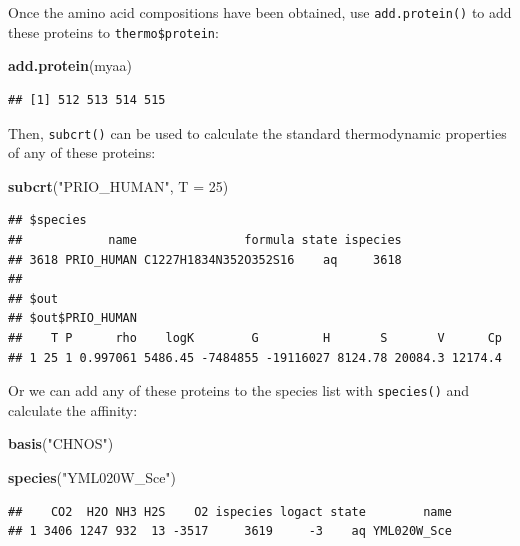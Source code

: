 \documentclass[]{tufte-handout}
\newenvironment{Shaded}{}{}
\newcommand{\KeywordTok}[1]{\textcolor[rgb]{0.00,0.44,0.13}{\textbf{#1}}}
\newcommand{\DataTypeTok}[1]{\textcolor[rgb]{0.56,0.13,0.00}{#1}}
\newcommand{\DecValTok}[1]{\textcolor[rgb]{0.25,0.63,0.44}{#1}}
\newcommand{\StringTok}[1]{\textcolor[rgb]{0.25,0.44,0.63}{#1}}
\newcommand{\NormalTok}[1]{#1}
\begin{document}
Once the amino acid compositions have been obtained, use
{\texttt{add.protein()}} to add these proteins to
\texttt{thermo\$protein}:

\begin{Shaded}
\begin{Highlighting}[]
\KeywordTok{add.protein}\NormalTok{(myaa)}
\end{Highlighting}
\end{Shaded}

\begin{verbatim}
## [1] 512 513 514 515
\end{verbatim}

Then, {\texttt{subcrt()}} can be used to calculate the standard
thermodynamic properties of any of these proteins:

\begin{Shaded}
\begin{Highlighting}[]
\KeywordTok{subcrt}\NormalTok{(}\StringTok{"PRIO_HUMAN"}\NormalTok{, }\DataTypeTok{T =} \DecValTok{25}\NormalTok{)}
\end{Highlighting}
\end{Shaded}

\begin{verbatim}
## $species
##            name               formula state ispecies
## 3618 PRIO_HUMAN C1227H1834N352O352S16    aq     3618
## 
## $out
## $out$PRIO_HUMAN
##    T P      rho    logK        G         H       S       V      Cp
## 1 25 1 0.997061 5486.45 -7484855 -19116027 8124.78 20084.3 12174.4
\end{verbatim}

Or we can add any of these proteins to the species list with
{\texttt{species()}} and calculate the affinity:

\begin{Shaded}
\begin{Highlighting}[]
\KeywordTok{basis}\NormalTok{(}\StringTok{"CHNOS"}\NormalTok{)}
\end{Highlighting}
\end{Shaded}

\begin{Shaded}
\begin{Highlighting}[]
\KeywordTok{species}\NormalTok{(}\StringTok{"YML020W_Sce"}\NormalTok{)}
\end{Highlighting}
\end{Shaded}

\begin{verbatim}
##    CO2  H2O NH3 H2S    O2 ispecies logact state        name
## 1 3406 1247 932  13 -3517     3619     -3    aq YML020W_Sce
\end{verbatim}
\end{document}
